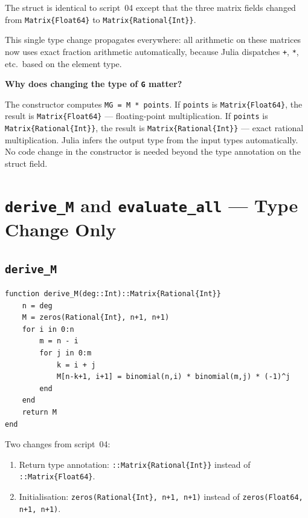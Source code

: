 \documentclass[12pt, a4paper]{article}
\newcommand{\cd}[1]{\texttt{#1}}
\begin{document}
The struct is identical to script~04 except that the three
matrix fields changed from \cd{Matrix\{Float64\}} to
\cd{Matrix\{Rational\{Int\}\}}.

This single type change propagates everywhere:
all arithmetic on these matrices now uses exact fraction
arithmetic automatically, because Julia dispatches
\cd{+}, \cd{*}, etc.\ based on the element type.

\begin{notebox}
\textbf{Why does changing the type of \cd{G} matter?}

The constructor computes \cd{MG = M * points}.
If \cd{points} is \cd{Matrix\{Float64\}}, the result is
\cd{Matrix\{Float64\}} --- floating-point multiplication.
If \cd{points} is \cd{Matrix\{Rational\{Int\}\}}, the result
is \cd{Matrix\{Rational\{Int\}\}} --- exact rational multiplication.
Julia infers the output type from the input types automatically.
No code change in the constructor is needed beyond the type
annotation on the struct field.
\end{notebox}


\section{\texttt{derive\_M} and \texttt{evaluate\_all} --- Type Change Only}

\subsection{\texttt{derive\_M}}

\begin{verbatim}
function derive_M(deg::Int)::Matrix{Rational{Int}}
    n = deg
    M = zeros(Rational{Int}, n+1, n+1)
    for i in 0:n
        m = n - i
        for j in 0:m
            k = i + j
            M[n-k+1, i+1] = binomial(n,i) * binomial(m,j) * (-1)^j
        end
    end
    return M
end
\end{verbatim}

Two changes from script~04:

\begin{enumerate}
  \item Return type annotation: \cd{::Matrix\{Rational\{Int\}\}}
        instead of \cd{::Matrix\{Float64\}}.
  \item Initialisation: \cd{zeros(Rational\{Int\}, n+1, n+1)}
        instead of \cd{zeros(Float64, n+1, n+1)}.
\end{enumerate}
\end{document}
